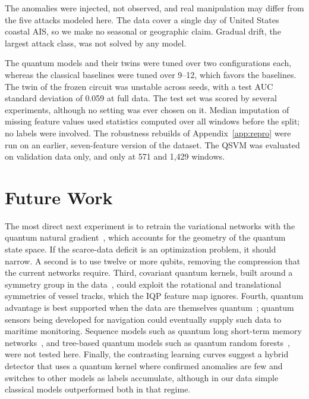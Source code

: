 \documentclass[journal]{IEEEtran}
\begin{document}
The anomalies were injected, not observed, and real manipulation may differ from
the five attacks modeled here. The data cover a single day of United States
coastal AIS, so we make no seasonal or geographic claim. Gradual drift, the
largest attack class, was not solved by any model.

The quantum models and their twins were tuned over two configurations each,
whereas the classical baselines were tuned over 9--12, which favors the
baselines. The twin of the frozen circuit was unstable across seeds, with a test
AUC standard deviation of 0.059 at full data. The test set was scored by several
experiments, although no setting was ever chosen on it. Median imputation of
missing feature values used statistics computed over all windows before the
split; no labels were involved. The robustness rebuilds of
Appendix~\ref{app:repro} were run on an earlier, seven-feature version of the
dataset. The QSVM was evaluated on validation data only, and only at 571 and
1,429 windows.

\section{Future Work}
\label{sec:future}
The most direct next experiment is to retrain the variational networks with the
quantum natural gradient~\cite{stokes2020qng}, which accounts for the geometry
of the quantum state space. If the scarce-data deficit is an optimization
problem, it should narrow. A second is to use twelve or more qubits, removing the
compression that the current networks require. Third, covariant quantum kernels,
built around a symmetry group in the data~\cite{glick2024covariant}, could
exploit the rotational and translational symmetries of vessel tracks, which the
IQP feature map ignores. Fourth, quantum advantage is best supported when the
data are themselves quantum~\cite{huang2022experiments}; quantum sensors being
developed for navigation could eventually supply such data to maritime
monitoring. Sequence models such as quantum long short-term memory
networks~\cite{chen2022qlstm}, and tree-based quantum models such as quantum
random forests~\cite{srikumar2024qrf}, were not tested here. Finally, the
contrasting learning curves suggest a hybrid detector that uses a quantum kernel
where confirmed anomalies are few and switches to other models as labels
accumulate, although in our data simple classical models outperformed both in
that regime.
\end{document}
